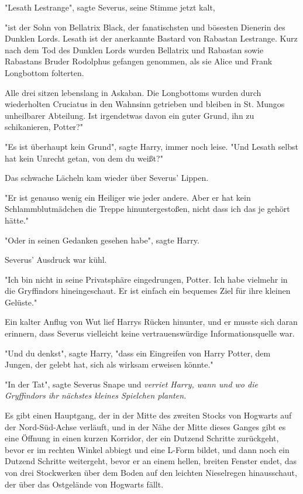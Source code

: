 {"Lesath Lestrange", sagte Severus, seine Stimme jetzt kalt,

"ist der Sohn von Bellatrix Black, der fanatischsten und bösesten Dienerin des Dunklen Lords. Lesath ist der anerkannte Bastard von Rabastan Lestrange. Kurz nach dem Tod des Dunklen Lords wurden Bellatrix und Rabastan sowie Rabastans Bruder Rodolphus gefangen genommen, als sie Alice und Frank Longbottom folterten.

Alle drei sitzen lebenslang in Askaban. Die Longbottoms wurden durch wiederholten Cruciatus in den Wahnsinn getrieben und bleiben in St. Mungos unheilbarer Abteilung. Ist irgendetwas davon ein guter Grund, ihn zu schikanieren, Potter?"

"Es ist überhaupt kein Grund", sagte Harry, immer noch leise. "Und Lesath selbst hat kein Unrecht getan, von dem du weißt?"

Das schwache Lächeln kam wieder über Severus' Lippen.

"Er ist genauso wenig ein Heiliger wie jeder andere. Aber er hat kein Schlammblutmädchen die Treppe hinuntergestoßen, nicht dass ich das je gehört hätte."

"Oder in seinen Gedanken gesehen habe", sagte Harry.

Severus' Ausdruck war kühl.

"Ich bin nicht in seine Privatsphäre eingedrungen, Potter. Ich habe vielmehr in die Gryffindors hineingeschaut. Er ist einfach ein bequemes Ziel für ihre kleinen Gelüste."

Ein kalter Anflug von Wut lief Harrys Rücken hinunter, und er musste sich daran erinnern, dass Severus vielleicht keine vertrauenswürdige Informationsquelle war.

"Und du denkst", sagte Harry, "dass ein Eingreifen von Harry Potter, dem Jungen, der gelebt hat, sich als wirksam erweisen könnte."

"In der Tat", sagte Severus Snape und \emph{verriet Harry, wann und wo die Gryffindors ihr nächstes kleines Spielchen planten.}

Es gibt einen Hauptgang, der in der Mitte des zweiten Stocks von Hogwarts auf der Nord-Süd-Achse verläuft, und in der Nähe der Mitte dieses Ganges gibt es eine Öffnung in einen kurzen Korridor, der ein Dutzend Schritte zurückgeht, bevor er im rechten Winkel abbiegt und eine L-Form bildet, und dann noch ein Dutzend Schritte weitergeht, bevor er an einem hellen, breiten Fenster endet, das von drei Stockwerken über dem Boden auf den leichten Nieselregen hinausschaut, der über das Ostgelände von Hogwarts fällt.

}
